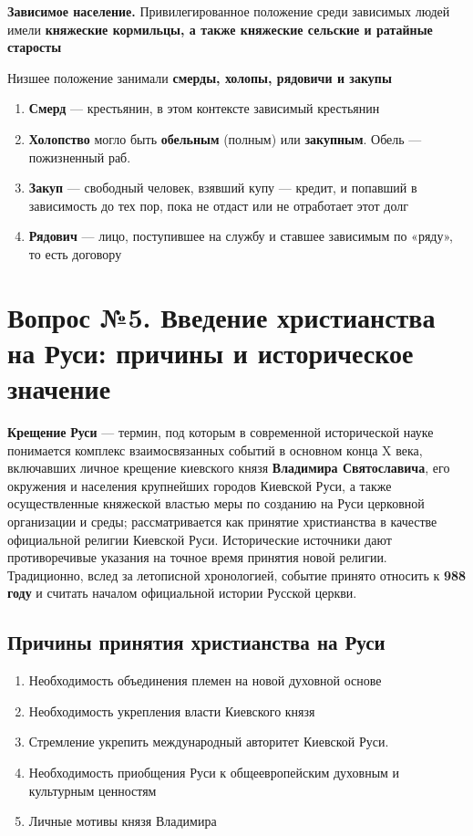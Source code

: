 \documentclass{article}
\begin{document}
\textbf{Зависимое население.} Привилегированное положение среди зависимых людей имели \textbf{княжеские кормильцы, а также княжеские сельские и ратайные старосты}

Низшее положение занимали \textbf{смерды, холопы, рядовичи и закупы}

\begin{enumerate}
    \item \textbf{Смерд} — крестьянин, в этом контексте зависимый крестьянин
    \item \textbf{Холопство} могло быть \textbf{обельным} (полным) или \textbf{закупным}. Обель — пожизненный раб.
    \item \textbf{Закуп} — свободный человек, взявший купу — кредит, и попавший в зависимость до тех пор, пока не отдаст или не отработает этот долг
    \item \textbf{Рядович} — лицо, поступившее на службу и ставшее зависимым по «ряду», то есть договору
\end{enumerate}

\pagebreak
\section{Вопрос №5. Введение христианства на Руси: причины и историческое значение}

\textbf{Крещение} \textbf{Руси} — термин, под которым в современной исторической науке понимается комплекс взаимосвязанных событий в основном конца X века, включавших личное крещение киевского князя \textbf{Владимира Святославича}, его окружения и населения крупнейших городов Киевской Руси, а также осуществленные княжеской властью меры по созданию на Руси церковной организации и среды; рассматривается как принятие христианства в качестве официальной религии Киевской Руси. Исторические источники дают противоречивые указания на точное время принятия новой религии. Традиционно, вслед за летописной хронологией, событие принято относить к \textbf{988 году} и считать началом официальной истории Русской церкви.

\subsection{Причины принятия христианства на Руси}

\begin{enumerate}
    \item Необходимость объединения племен на новой духовной основе
    \item Необходимость укрепления власти Киевского князя 
    \item Стремление укрепить международный авторитет Киевской Руси.
    \item Необходимость приобщения Руси к общеевропейским духовным и культурным ценностям
    \item Личные мотивы князя Владимира
\end{enumerate}
\end{document}
